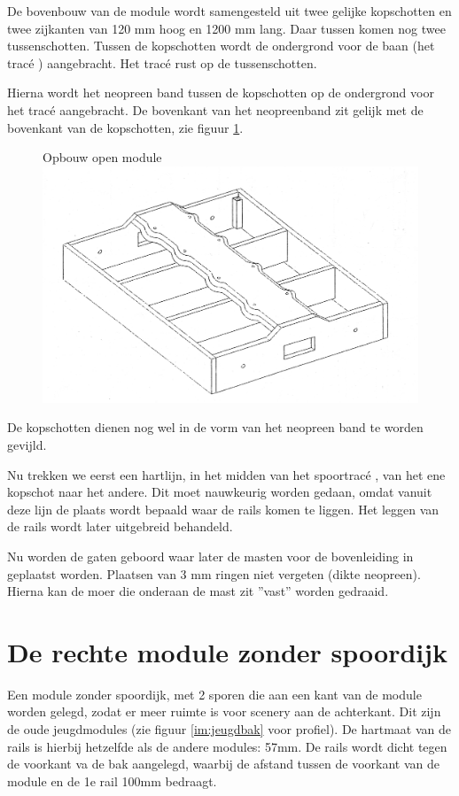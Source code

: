 \documentclass[12pt,a4paper]{report}
\newcommand*{\trace}{trac\'{e} }
\begin{document}
De bovenbouw van de module wordt samengesteld uit twee gelijke kopschotten en twee zijkanten van 120 mm hoog en 1200 mm lang. Daar tussen komen nog twee tussenschotten.
Tussen de kopschotten wordt de ondergrond voor de baan (het \trace) aangebracht. Het \trace rust op de tussenschotten. 

Hierna wordt het neopreen band tussen de kopschotten op de ondergrond voor het \trace aangebracht. De bovenkant van het neopreenband zit gelijk met de bovenkant van de kopschotten, zie figuur \ref{figuur1}.

\begin{figure}[ht]
  \captionbox
  {Opbouw open module\label{figuur1}}
  {\includegraphics[scale=0.2]{images/rcu_figuur1}}
\end{figure}

De kopschotten dienen nog wel in de vorm van het neopreen band te worden gevijld. 

Nu trekken we eerst een hartlijn, in het midden van het spoor\trace, van het ene kopschot naar het andere. Dit moet nauwkeurig worden gedaan, omdat vanuit deze lijn de plaats wordt bepaald waar de rails komen te liggen.
Het leggen van de rails wordt later uitgebreid behandeld.

Nu worden de gaten geboord waar later de masten voor de bovenleiding in geplaatst worden. 
Plaatsen van 3 mm ringen niet vergeten (dikte neopreen).
Hierna kan de moer die onderaan de mast zit ''vast'' worden gedraaid.

\section{De rechte module zonder spoordijk}
Een module zonder spoordijk, met 2 sporen die aan een kant van de module worden gelegd, zodat er meer ruimte is voor scenery aan de achterkant. Dit zijn de oude jeugdmodules (zie figuur \ref{im:jeugdbak} voor profiel).
De hartmaat van de rails is hierbij hetzelfde als de andere modules: 57mm. De rails wordt dicht tegen de voorkant va de bak aangelegd, waarbij de afstand tussen de voorkant van de module en de 1e rail 100mm bedraagt.
\end{document}
